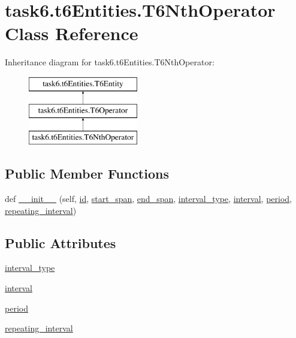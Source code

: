 \hypertarget{classtask6_1_1t6Entities_1_1T6NthOperator}{}\section{task6.\+t6\+Entities.\+T6\+Nth\+Operator Class Reference}
\label{classtask6_1_1t6Entities_1_1T6NthOperator}
Inheritance diagram for task6.\+t6\+Entities.\+T6\+Nth\+Operator\+:\begin{figure}[H]
\begin{center}
\leavevmode
\includegraphics[height=3.000000cm]{classtask6_1_1t6Entities_1_1T6NthOperator}
\end{center}
\end{figure}
\subsection*{Public Member Functions}
\begin{DoxyCompactItemize}
\item 
def \hyperlink{classtask6_1_1t6Entities_1_1T6NthOperator_a8233039b4503d58bb61f2a81c9e5ab8a}{\+\_\+\+\_\+init\+\_\+\+\_\+} (self, \hyperlink{classtask6_1_1t6Entities_1_1T6Entity_afeeced8134bb3ebe0cfecc64d0ab46a4}{id}, \hyperlink{classtask6_1_1t6Entities_1_1T6Entity_a52779e9af8864dc98e8b02fc5b9b041a}{start\+\_\+span}, \hyperlink{classtask6_1_1t6Entities_1_1T6Entity_aeb402200b156cd9562c5111dfe777b98}{end\+\_\+span}, \hyperlink{classtask6_1_1t6Entities_1_1T6NthOperator_ae675666c1fa8791ff44ffe276eb28c9e}{interval\+\_\+type}, \hyperlink{classtask6_1_1t6Entities_1_1T6NthOperator_a2482a1dd907a4d625dd56645b2fae789}{interval}, \hyperlink{classtask6_1_1t6Entities_1_1T6NthOperator_aa330004bf54b51adec750472236e60ed}{period}, \hyperlink{classtask6_1_1t6Entities_1_1T6NthOperator_a02427933a75c637d8eae20e00cec6bfd}{repeating\+\_\+interval})
\end{DoxyCompactItemize}
\subsection*{Public Attributes}
\begin{DoxyCompactItemize}
\item 
\hyperlink{classtask6_1_1t6Entities_1_1T6NthOperator_ae675666c1fa8791ff44ffe276eb28c9e}{interval\+\_\+type}
\item 
\hyperlink{classtask6_1_1t6Entities_1_1T6NthOperator_a2482a1dd907a4d625dd56645b2fae789}{interval}
\item 
\hyperlink{classtask6_1_1t6Entities_1_1T6NthOperator_aa330004bf54b51adec750472236e60ed}{period}
\item 
\hyperlink{classtask6_1_1t6Entities_1_1T6NthOperator_a02427933a75c637d8eae20e00cec6bfd}{repeating\+\_\+interval}
\end{DoxyCompactItemize}


